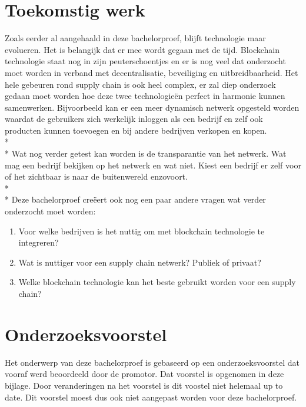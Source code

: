 \documentclass[fleqn,a4paper,12pt]{book}
\begin{document}
\chapter{Toekomstig werk}
Zoals eerder al aangehaald in deze bachelorproef, blijft technologie maar evolueren. Het is belangijk dat er mee wordt gegaan met de tijd. Blockchain technologie staat nog in zijn peuterschoentjes en er is nog veel dat onderzocht moet worden in verband met decentralisatie, beveiliging en uitbreidbaarheid. Het hele gebeuren rond supply chain is ook heel complex, er zal diep onderzoek gedaan moet worden hoe deze twee technologieën perfect in harmonie kunnen samenwerken. Bijvoorbeeld kan er een meer dynamisch netwerk opgesteld worden waardat de gebruikers zich werkelijk inloggen als een bedrijf en zelf ook producten kunnen toevoegen en bij andere bedrijven verkopen en kopen.\\*\\*
Wat nog verder getest kan worden is de transparantie van het netwerk. Wat mag een bedrijf bekijken op het netwerk en wat niet. Kiest een bedrijf er zelf voor of het zichtbaar is naar de buitenwereld enzovoort.\\*\\*
Deze bachelorproef creëert ook nog een paar andere vragen wat verder onderzocht moet worden:

\begin{enumerate}
	\item Voor welke bedrijven is het nuttig om met blockchain technologie te integreren?
	\item Wat is nuttiger voor een supply chain netwerk? Publiek of privaat?
	\item Welke blockchain technologie kan het beste gebruikt worden voor een supply chain?
\end{enumerate}




\appendix


\chapter{Onderzoeksvoorstel}

Het onderwerp van deze bachelorproef is gebaseerd op een onderzoeksvoorstel dat vooraf werd beoordeeld door de promotor. Dat voorstel is opgenomen in deze bijlage. Door veranderingen na het voorstel is dit voostel niet helemaal up to date. Dit voorstel moest dus ook niet aangepast worden voor deze bachelorproef.
\end{document}
